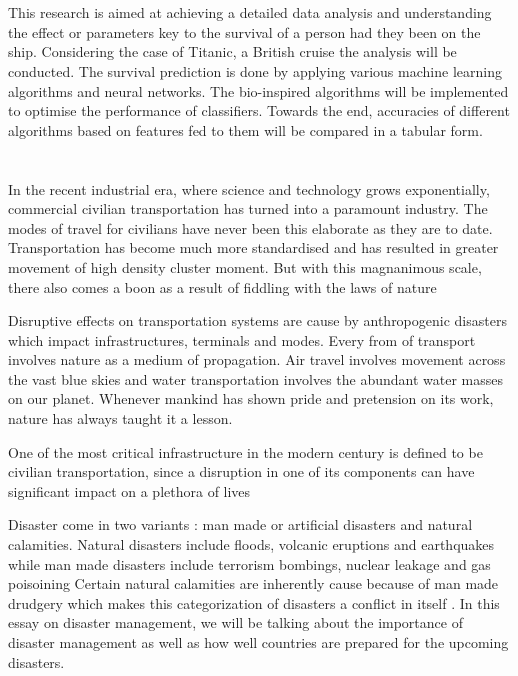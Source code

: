 \documentclass[12pt]{article}
\newcommand{\nd}{\noindent}
\newcommand{\secsize}{\fontsize{15pt}{12pt}\selectfont}
\begin{document}
\large  
\parskip 3mm 
\tableofcontents
\newpage
\listoffigures
\newpage
\section{\textbf{\secsize{ABSTRACT}}}
This research is aimed at achieving a detailed data analysis and understanding the effect or parameters key to the survival of a person had they been on the ship. Considering the case of Titanic, a British cruise the analysis will be conducted. The survival prediction is done by applying various machine learning algorithms and neural networks. The bio-inspired algorithms will be implemented to optimise the performance of classifiers. Towards the end, accuracies of different algorithms based on features fed to them will be compared in a tabular form.
\newpage
\section{\textbf{\secsize{INTRODUCTION}}}
In the recent industrial era, where science and technology grows exponentially, commercial civilian transportation has turned into a paramount industry. The modes of travel for civilians have never been this elaborate as they are to date. Transportation has become much more standardised and has resulted in greater movement of high density cluster moment. But with this magnanimous scale, there also comes a boon as a result of  fiddling with the laws of nature 

\nd Disruptive effects on transportation systems are cause by anthropogenic disasters which impact infrastructures, terminals and modes. Every from of transport involves nature as a medium of propagation. Air travel involves movement across the vast blue skies and water transportation involves the abundant water masses on our planet. Whenever mankind has shown pride and pretension on its work, nature has always taught it a lesson.

\nd One of the most critical infrastructure in the modern century is defined to be civilian transportation, since a disruption in one of its components can have significant impact on a plethora of lives

\nd Disaster come in two variants : man made or artificial disasters and natural calamities. Natural disasters include floods, volcanic eruptions and earthquakes while man made disasters include terrorism bombings, nuclear leakage and gas poisoining  Certain natural calamities are inherently cause because of man made drudgery which makes this categorization of disasters a conflict in itself . In this essay on disaster management, we will be talking about the importance of disaster management as well as how well countries are prepared for the upcoming disasters.
\end{document}
